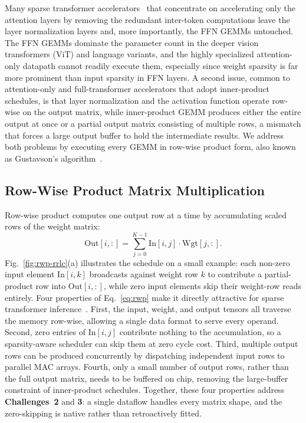 \documentclass[lettersize,journal]{IEEEtran}
\begin{document}
Many sparse transformer accelerators~\cite{Ham2020A3,Liqiang2021Sanger,Hanrui2021SpAtten,Guan2022SALO,Sangyeob2024CTransformer,Sangyeob2025SlimLlama} that concentrate on accelerating only the attention layers by removing the redundant inter-token computations %
leave the layer normalization layers and, more importantly, the FFN GEMMs untouched. The FFN GEMMs dominate the parameter count in the deeper vision transformers (ViT) and language variants, and the highly specialized attention-only datapath cannot readily execute them, especially since weight sparsity is far more prominent than input sparsity in FFN layers. A second issue, common to attention-only and full-transformer accelerators that adopt inner-product schedules, is that layer normalization and the activation function operate row-wise on the output matrix, while inner-product GEMM produces either the entire output at once or a partial output matrix consisting of multiple rows, a mismatch that forces a large output buffer to hold the intermediate results. We address both problems by executing every GEMM in row-wise product form, also known as Gustavson's algorithm~\cite{gustavson1978}.

\subsection{Row-Wise Product Matrix Multiplication}
\label{sec:algo-rwp}

Row-wise product computes one output row at a time by accumulating scaled rows of the weight matrix:
\begin{equation}
    \mathrm{Out}[i,:] = \sum_{j=0}^{K-1} \mathrm{In}[i,j]\cdot \mathrm{Wgt}[j,:].
\label{eq:rwp}
\end{equation}
Fig.~\ref{fig:rwp-rrlc}(a) illustrates the schedule on a small example: each non-zero input element $\mathrm{In}[i,k]$ broadcasts against weight row $k$ to contribute a partial-product row into $\mathrm{Out}[i,:]$, while zero input elements skip their weight-row reads entirely. Four properties of Eq.~\eqref{eq:rwp} make it directly attractive for sparse transformer inference~\cite{Nitish2020MatRaptor}. First, the input, weight, and output tensors all traverse the memory row-wise, allowing a single data format to serve every operand. Second, zero entries of $\mathrm{In}[i,j]$ contribute nothing to the accumulation, so a sparsity-aware scheduler can skip them at zero cycle cost. Third, multiple output rows can be produced concurrently by dispatching independent input rows to parallel MAC arrays. Fourth, only a small number of output rows, rather than the full output matrix, needs to be buffered on chip, removing the large-buffer constraint of inner-product schedules. Together, these four properties address \textbf{Challenges~2} and \textbf{3}: a single dataflow handles every matrix shape, and the zero-skipping is native rather than retroactively fitted.
\end{document}
